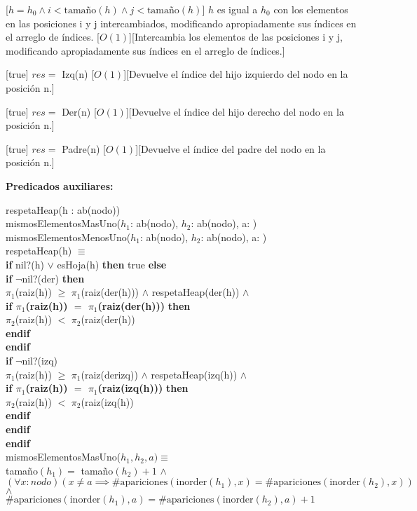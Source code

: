 \documentclass[../main.tex]{subfiles}
\begin{document}
\begin{interfaz}
[$h = h_0 \land i < \text{tamaño}(h) \land j < \text{tamaño}(h)$]
{$h$ es igual a $h_0$ con los elementos en las posiciones i y j intercambiados, modificando apropiadamente sus índices en el arreglo de índices.}
[$O(1)$][Intercambia los elementos de las posiciones i y j, modificando apropiadamente sus índices en el arreglo de índices.]

[true]
{$res =$ Izq(n)}
[$O(1)$][Devuelve el índice del hijo izquierdo del nodo en la posición n.]

[true]
{$res =$ Der(n)}
[$O(1)$][Devuelve el índice del hijo derecho del nodo en la posición n.]

[true]
{$res =$ Padre(n)}
[$O(1)$][Devuelve el índice del padre del nodo en la posición n.]

{\large\bfseries Predicados auxiliares: }

respetaHeap(h : ab(nodo)) \\
mismosElementosMasUno($h_1$: ab(nodo), $h_2$: ab(nodo), a: \nat) \\
mismosElementosMenosUno($h_1$: ab(nodo), $h_2$: ab(nodo), a: \nat) \\

respetaHeap(h) $\equiv$ \\
\textbf{if} nil?(h) $\lor$ esHoja(h) \textbf{then} true \textbf{else} \\
 \textbf{if} $\neg$nil?(der) \textbf{then} \\
 $\pi_1$(raiz(h)) $\geq$ $\pi_1$(raiz(der(h))) $\land$ respetaHeap(der(h)) $\land$\\
 \textbf{if $\pi_1$(raiz(h)) $=$ $\pi_1$(raiz(der(h)))} \textbf{then} \\
 $\pi_2$(raiz(h)) $<$ $\pi_2$(raiz(der(h)) \\
 \textbf{endif} \\
 \textbf{endif} \\
 \textbf{if} $\neg$nil?(izq) \\
 $\pi_1$(raiz(h)) $\geq$ $\pi_1$(raiz(derizq)) $\land$ respetaHeap(izq(h)) $\land$\\
 \textbf{if $\pi_1$(raiz(h)) $=$ $\pi_1$(raiz(izq(h)))} \textbf{then} \\
 $\pi_2$(raiz(h)) $<$ $\pi_2$(raiz(izq(h)) \\
 \textbf{endif} \\
 \textbf{endif} \\
\textbf{endif} \\
\vspace{3mm}
mismosElementosMasUno($h_1, h_2, a) \equiv$ \\
tamaño$(h_1) =$ tamaño$(h_2) + 1$ $\land$ \\
$(\forall x: nodo) (x \neq a \implies \#\text{apariciones}(\text{inorder}(h_1), x) = \#\text{apariciones}(\text{inorder}(h_2), x))$ $\land$ \\
$\#\text{apariciones}(\text{inorder}(h_1), a) = \#\text{apariciones}(\text{inorder}(h_2), a) + 1$


\end{interfaz}
\end{document}
